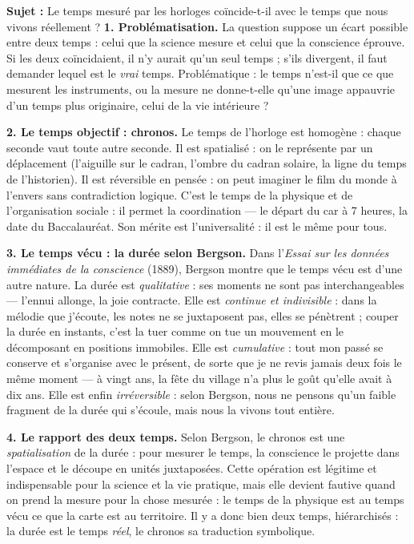 \documentclass[11pt]{article}
\begin{document}
\begin{exoresolu}
\textbf{Sujet :} Le temps mesuré par les horloges coïncide-t-il avec le temps que nous vivons réellement ?
\tcblower
\textbf{1. Problématisation.} La question suppose un écart possible entre deux temps : celui que la science mesure et celui que la conscience éprouve. Si les deux coïncidaient, il n'y aurait qu'un seul temps ; s'ils divergent, il faut demander lequel est le \emph{vrai} temps. Problématique : le temps n'est-il que ce que mesurent les instruments, ou la mesure ne donne-t-elle qu'une image appauvrie d'un temps plus originaire, celui de la vie intérieure ?

\textbf{2. Le temps objectif : chronos.} Le temps de l'horloge est homogène : chaque seconde vaut toute autre seconde. Il est spatialisé : on le représente par un déplacement (l'aiguille sur le cadran, l'ombre du cadran solaire, la ligne du temps de l'historien). Il est réversible en pensée : on peut imaginer le film du monde à l'envers sans contradiction logique. C'est le temps de la physique et de l'organisation sociale : il permet la coordination --- le départ du car à 7 heures, la date du Baccalauréat. Son mérite est l'universalité : il est le même pour tous.

\textbf{3. Le temps vécu : la durée selon Bergson.} Dans l'\emph{Essai sur les données immédiates de la conscience} (1889), Bergson montre que le temps vécu est d'une autre nature. La durée est \emph{qualitative} : ses moments ne sont pas interchangeables --- l'ennui allonge, la joie contracte. Elle est \emph{continue et indivisible} : dans la mélodie que j'écoute, les notes ne se juxtaposent pas, elles se pénètrent ; couper la durée en instants, c'est la tuer comme on tue un mouvement en le décomposant en positions immobiles. Elle est \emph{cumulative} : tout mon passé se conserve et s'organise avec le présent, de sorte que je ne revis jamais deux fois le même moment --- à vingt ans, la fête du village n'a plus le goût qu'elle avait à dix ans. Elle est enfin \emph{irréversible} : selon Bergson, nous ne pensons qu'un faible fragment de la durée qui s'écoule, mais nous la vivons tout entière.

\textbf{4. Le rapport des deux temps.} Selon Bergson, le chronos est une \emph{spatialisation} de la durée : pour mesurer le temps, la conscience le projette dans l'espace et le découpe en unités juxtaposées. Cette opération est légitime et indispensable pour la science et la vie pratique, mais elle devient fautive quand on prend la mesure pour la chose mesurée : le temps de la physique est au temps vécu ce que la carte est au territoire. Il y a donc bien deux temps, hiérarchisés : la durée est le temps \emph{réel}, le chronos sa traduction symbolique.


\end{exoresolu}
\end{document}

